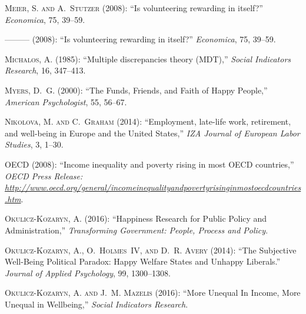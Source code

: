 \documentclass[10pt, letterpaper]{article}
\begin{document}
\begin{spacing}{1.4}
\begin{spacing}{.9}
\begin{thebibliography}{71}
\textsc{Meier, S. and A.~Stutzer} (2008{}): \enquote{Is
  volunteering rewarding in itself?} \emph{Economica}, 75, 39--59.

---\hspace{-.1pt}---\hspace{-.1pt}--- (2008{}): \enquote{Is
  volunteering rewarding in itself?} \emph{Economica}, 75, 39--59.

\textsc{Michalos, A.} (1985): \enquote{Multiple discrepancies theory (MDT),}
  \emph{Social Indicators Research}, 16, 347--413.

\textsc{Myers, D.~G.} (2000): \enquote{The Funds, Friends, and Faith of Happy
  People,} \emph{American Psychologist}, 55, 56--67.

\textsc{Nikolova, M. and C.~Graham} (2014): \enquote{Employment, late-life
  work, retirement, and well-being in Europe and the United States,} \emph{IZA
  Journal of European Labor Studies}, 3, 1--30.

\textsc{OECD} (2008): \enquote{Income inequality and poverty rising in most
  OECD countries,} \emph{OECD Press Release:
  \url{http://www.oecd.org/general/incomeinequalityandpovertyrisinginmostoecdcountries.htm}}.

\textsc{Okulicz-Kozaryn, A.} (2016): \enquote{Happiness Research for Public
  Policy and Administration,} \emph{Transforming Government: People, Process
  and Policy}.

\textsc{Okulicz-Kozaryn, A., O.~Holmes~IV, and D.~R. Avery} (2014):
  \enquote{The Subjective Well-Being Political Paradox: Happy Welfare States
  and Unhappy Liberals.} \emph{Journal of Applied Psychology}, 99, 1300--1308.

\textsc{Okulicz-Kozaryn, A. and J.~M. Mazelis} (2016): \enquote{More Unequal In
  Income, More Unequal in Wellbeing,} \emph{Social Indicators Research}.


\end{thebibliography}
\end{spacing}
\end{spacing}
\end{document}
